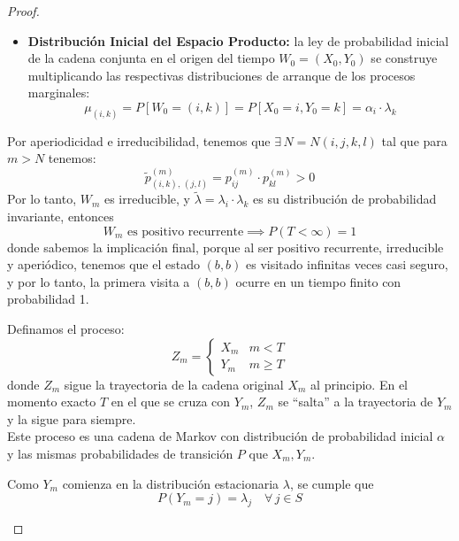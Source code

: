 \begin{teo}
\begin{proof}
\begin{description}
\begin{itemize}
        \item \textbf{Distribución Inicial del Espacio Producto:} la ley de probabilidad inicial de la cadena conjunta en el origen del tiempo $W_0 = (X_0, Y_0)$ se construye multiplicando las respectivas distribuciones de arranque de los procesos marginales:
        \[
        \mu_{(i,k)} = P[W_0 = (i,k)] = P[X_0 = i, Y_0 = k] = \alpha_i \cdot \lambda_k
        \]
    \end{itemize}
    Por aperiodicidad e irreducibilidad, tenemos que $\exists \, N = N(i,j,k,l)$ tal que para $m > N$ tenemos:
    \[
    \widetilde{p}_{(i,k), \, (j,l)}^{(m)} = p_{ij}^{(m)} \cdot p_{kl}^{(m)} > 0
    \]
    Por lo tanto, $W_m$ es irreducible, y $\tilde{\lambda} = \lambda_i \cdot \lambda_k$ es su distribución de probabilidad invariante, entonces
    \[
    W_m \text{ es positivo recurrente} \implies P(T < \infty) = 1
    \]
    donde sabemos la implicación final, porque al ser positivo recurrente, irreducible y aperiódico, tenemos que el estado $(b,b)$ es visitado infinitas veces casi seguro, y por lo tanto, la primera visita a $(b,b)$ ocurre en un tiempo finito con probabilidad 1.
    
    \item[\tbf{Step 3.}] Definamos el proceso:
        \[
        Z_m = \begin{cases} 
        X_m & m < T \\ 
        Y_m & m \ge T 
        \end{cases}
        \]
        donde $Z_m$ sigue la trayectoria de la cadena original $X_m$ al principio. En el momento exacto $T$ en el que se cruza con $Y_m$, $Z_m$ se ``salta'' a la trayectoria de $Y_m$ y la sigue para siempre. \\

        \noindent 
        Este proceso es una cadena de Markov con distribución de probabilidad inicial $\alpha$ y las mismas probabilidades de transición $P$ que $X_m, Y_m$.

        \noindent 
        Como $Y_m$ comienza en la distribución estacionaria $\lambda$, se cumple que 
        $$P(Y_m = j) = \lambda_j \quad \forall \, j \in S$$


\end{description}
\end{proof}
\end{teo}
